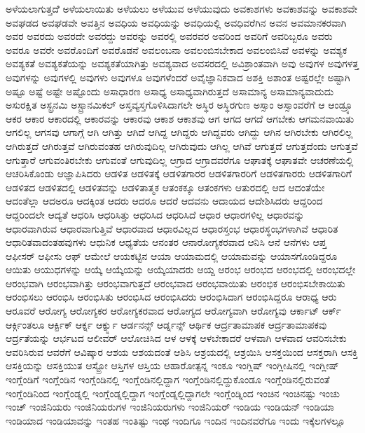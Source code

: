 {ಅಳೆಯಲಾಗುತ್ತದೆೆ
ಅಳೆಯಲಾಯಿತು
ಅಳೆಯಲು
ಅಳೆಯುವ
ಅಳೆಯುವುದು
ಅವಕಾಶಗಳು
ಅವಕಾಶವನ್ನು
ಅವಕಾಶವೇ
ಅವಘಡದ
ಅವಘಡವೇ
ಅವತ್ತಿನ
ಅವಧಿಯ
ಅವಧಿಯನ್ನು
ಅವಧಿಯಲ್ಲಿ
ಅವಧಿವರೆಗಿನ
ಅವನ
ಅವಮಾನಕರವಾಗಿ
ಅವರ
ಅವರದು
ಅವರದೇ
ಅವರದ್ದು
ಅವರನ್ನು
ಅವರಲ್ಲಿ
ಅವರವರ
ಅವರಿಂದ
ಅವರಿಗೆ
ಅವರಿಬ್ಬರೂ
ಅವರು
ಅವರೂ
ಅವರೇ
ಅವರೊಂದಿಗೆ
ಅವರೊಡನೆ
ಅವಲಂಬನಾ
ಅವಲಂಬಿಸಬೇಕಾದ
ಅವಲಂಬಿಸಿವೆ
ಅವಳನ್ನು
ಅವಶ್ಯಕ
ಅವಶ್ಯಕತೆ
ಅವಶ್ಯಕತೆಯನ್ನು
ಅವಶ್ಯಕತೆಯಾಗಿತ್ತು
ಅವಶ್ಯವಾದ
ಅವಸರದಲ್ಲಿ
ಅವಿಶ್ರಾಂತವಾಗಿ
ಅವು
ಅವುಗಳ
ಅವುಗಳತ್ತ
ಅವುಗಳನ್ನು
ಅವುಗಳಲ್ಲಿ
ಅವುಗಳು
ಅವುಗಳೂ
ಅವುಗಳೆಂದರೆ
ಅವೈಜ್ಞಾನಿಕವಾದ
ಅಶಕ್ತಿ
ಅಶಾಂತ
ಅಷ್ಟರಲ್ಲೇ
ಅಷ್ಟಾಗಿ
ಅಷ್ಟೂ
ಅಷ್ಟೆ
ಅಷ್ಟೇ
ಅಷ್ಟೊಂದು
ಅಸಾಧಾರಣ
ಅಸಾಧ್ಯ
ಅಸಾಧ್ಯವಾಗಿರುತ್ತದೆ
ಅಸಾಮಾನ್ಯ
ಅಸಾಮಾನ್ಯವಾದುದು
ಅಸುರಕ್ಷಿತ
ಅಸ್ಟ್ರನಮಿ
ಅಸ್ಟ್ರಾನಮಿಕಲ್
ಅಸ್ತವ್ಯಸ್ತಗೊಳಿಸಿದಾಗಲೇ
ಅಸ್ಥಿರ
ಅಸ್ಥಿರಗುಣ
ಅಸ್ಸಾಂ
ಅಸ್ಸಾಂವರೆಗೆ
ಆ
ಆಂಡ್ರ್ಯೂ
ಆಕರ
ಆಕಾರ
ಆಕಾರದಲ್ಲಿ
ಆಕಾರವನ್ನು
ಆಕಾರವು
ಆಕಾಶ
ಆಕಾಶವು
ಆಗ
ಆಗದ
ಆಗದೆ
ಆಗಬೇಕು
ಆಗಮನವಾಯಿತು
ಆಗಲಿಲ್ಲ
ಆಗಸವು
ಆಗಾಗ್ಗೆ
ಆಗಿ
ಆಗಿತ್ತು
ಆಗಿದೆ
ಆಗಿದ್ದ
ಆಗಿದ್ದರು
ಆಗಿದ್ದವರು
ಆಗಿದ್ದು
ಆಗಿನ
ಆಗಿರಬೇಕು
ಆಗಿರಲಿಲ್ಲ
ಆಗಿರುತ್ತದೆ
ಆಗಿರುತ್ತವೆ
ಆಗಿರುವಂತಹ
ಆಗಿರುವುದಿಲ್ಲ
ಆಗಿರುವುದು
ಆಗಿಲ್ಲ
ಆಗಿವೆ
ಆಗುತ್ತದೆ
ಆಗುತ್ತದೆಂದು
ಆಗುತ್ತವೆ
ಆಗುತ್ತಾರೆ
ಆಗುವಂತಿರಬೇಕು
ಆಗುವಂತೆ
ಆಗುವುದಿಲ್ಲ
ಆಗ್ರಾದ
ಆಗ್ರಾದವರೆಗೂ
ಆಘಾತಕ್ಕೆ
ಆಘಾತವೇ
ಆಚರಣೆಯಲ್ಲಿ
ಆಚರಿಸಿಕೊಂಡು
ಆಜ್ಞಾಪಿಸಿದರು
ಆಡಳಿತ
ಆಡಳಿತಕ್ಕೆ
ಆಡಳಿತಗಾರರ
ಆಡಳಿತಗಾರರಿಗೆ
ಆಡಳಿತಗಾರರು
ಆಡಳಿತಗಾರಿಗೆ
ಆಡಳಿತದ
ಆಡಳಿತದಲ್ಲಿ
ಆಡಳಿತವನ್ನು
ಆಡಳಿತಾತ್ಮಕ
ಆತಂಕಕ್ಕೂ
ಆತಂಕಗಳು
ಆತುರದಲ್ಲಿ
ಆದ
ಆದಂತೆಯೇ
ಆದಂತೆಲ್ಲಾ
ಆದಅರೂ
ಆದಕ್ಕಿಂತ
ಆದರು
ಆದರೂ
ಆದರೆ
ಆದವನು
ಆದಾಯದ
ಆದೇಶಿಸಿದರು
ಆದ್ದರಿಂದ
ಆದ್ದರಿಂದಲೇ
ಆದ್ಯತೆ
ಆಧರಿಸಿ
ಆಧರಿಸಿತ್ತು
ಆಧರಿಸಿದ
ಆಧರಿಸಿದೆ
ಆಧಾರ
ಆಧಾರಗಳಿಲ್ಲ
ಆಧಾರವನ್ನು
ಆಧಾರವಾಗಿರುವ
ಆಧಾರವಾಗುತ್ತಿವೆ
ಆಧಾರವಾದ
ಆಧಾರವಿಲ್ಲದ
ಆಧಾರಸ್ತಂಭ
ಆಧಾರಸ್ಥಂಭಗಳಾಗಿವೆ
ಆಧಾರಿತ
ಆಧಾರಿತವಾದಂತಹವುಗಳು
ಆಧುನಿಕ
ಆಧ್ಯತೆಯ
ಆನಂತರ
ಆನಾರೋಗ್ಯಕರವಾದ
ಆನಿಸಿ
ಆನೆ
ಆನೆಗಳು
ಆಪ್ತ
ಆಫೀಸರ್
ಆಫೀಸು
ಆಫ್
ಆಮೇಲೆ
ಆಯಕಟ್ಟಿನ
ಆಯಾ
ಆಯಾಮದಲ್ಲಿ
ಆಯಾಮವನ್ನು
ಆಯಾಸಗೊಂಡಿದ್ದರೂ
ಆಯಿತು
ಆಯುಧಗಳನ್ನು
ಆಯ್ಕೆ
ಆಯ್ಕೆಯನ್ನು
ಆಯ್ಕೆಯಾದರು
ಆಯ್ದ
ಆರಂಭ
ಆರಂಭದ
ಆರಂಭದಲ್ಲಿ
ಆರಂಭದಲ್ಲೇ
ಆರಂಭವಾಗಿ
ಆರಂಭವಾಗಿತ್ತು
ಆರಂಭವಾಗುತ್ತದೆ
ಆರಂಭವಾದ
ಆರಂಭವಾಯಿತು
ಆರಂಭಿಕ
ಆರಂಭಿಸಬೇಕಾಯಿತು
ಆರಂಭಿಸಲು
ಆರಂಭಿಸಿ
ಆರಂಭಿಸಿತು
ಆರಂಭಿಸಿದ
ಆರಂಭಿಸಿದರು
ಆರಂಭಿಸಿದಾಗ
ಆರಂಭಿಸಿದ್ದರೂ
ಆರಾಧ್ಯ
ಆರು
ಆರೂವರೆ
ಆರೋಗ್ಯ
ಆರೋಗ್ಯಕರ
ಆರೋಗ್ಯಕರವಾದ
ಆರೋಗ್ಯದ
ಆರೋಗ್ಯವಾಗಿ
ಆರೋಗ್ಯವು
ಆರ್ಕಾಟ್
ಆರ್ಕ್
ಆರ್ಕ್ಗಿಂತಲೂ
ಆರ್ಕ್ಟಿಕ್
ಆರ್ಕ್ನ
ಆರ್ಕ್ನ್ನು
ಆರ್ಡನನ್ಸ್
ಆರ್ಡ್ನನ್ಸ್
ಆರ್ಥಿಕ
ಆರ್ದ್ರತಾಮಾಪಕ
ಆರ್ದ್ರತಾಮಾಪಕವು
ಆರ್ದ್ರತೆಯನ್ನು
ಆರ್ಭಟದ
ಆಲೀವರ್
ಆಲೋಚಿಸಿದ
ಆಳ
ಆಳಕ್ಕೆ
ಆಳಬೇಕಾದರೆ
ಆಳವಾಗಿ
ಆಳವಾದ
ಆವರಿಸಬೇಕು
ಆವರಿಸಿರುವ
ಆವರೆಗೆ
ಆವಿಷ್ಕಾರ
ಆಶಯ
ಆಶಯದಂತೆ
ಆಶಿಸಿ
ಆಶ್ರಯದಲ್ಲಿ
ಆಶ್ರಯಿಸಿ
ಆಸಕ್ತಯಿಂದ
ಆಸಕ್ತರಾಗಿ
ಆಸಕ್ತಿ
ಆಸಕ್ತಿಯನ್ನು
ಆಸಕ್ತಿಯುತ
ಆಸ್ಟ್ರೋ
ಆಸ್ತಿಗಳ
ಆಸ್ತಿಯ
ಆಹಾರೋತ್ಪನ್ನ
ಇಂಕೂ
ಇಂಗ್ಲಿಷ್
ಇಂಗ್ಲೀಷಿನಲ್ಲಿ
ಇಂಗ್ಲೀಷ್
ಇಂಗ್ಲೆಂಡಿಗೆ
ಇಂಗ್ಲೆಂಡಿನ
ಇಂಗ್ಲೆಂಡಿನಲ್ಲಿ
ಇಂಗ್ಲೆಂಡಿನಲ್ಲಿದ್ದಾಗ
ಇಂಗ್ಲೆಂಡಿನಲ್ಲಿದ್ದುಕೊಂಡೂ
ಇಂಗ್ಲೆಂಡಿನಲ್ಲಿರುವಂತೆ
ಇಂಗ್ಲೆಂಡಿನಿಂದ
ಇಂಗ್ಲೆಂಡ್ನಲ್ಲಿ
ಇಂಗ್ಲೆಂಡ್ನಲ್ಲಿದ್ದಾಗ
ಇಂಗ್ಲೆಂಡ್ನಲ್ಲಿದ್ದಾಗಲೇ
ಇಂಗ್ಲೆಂಡ್ನಿಂದ
ಇಂಚಿನ
ಇಂಚಿನಷ್ಟು
ಇಂಚು
ಇಂಚ್
ಇಂಜಿನಿಯರು
ಇಂಜಿನಿಯರುಗಳ
ಇಂಜಿನಿಯರುಗಳು
ಇಂಜಿನಿಯರ್
ಇಂಡಿಯ
ಇಂಡಿಯನ್
ಇಂಡಿಯಾ
ಇಂಡಿಯಾದ
ಇಂಡಿಯಾವನ್ನು
ಇಂತಹ
ಇಂತಿಷ್ಟು
ಇಂಥ
ಇಂದಿಗೂ
ಇಂದಿನ
ಇಂದಿನವರೆಗೂ
ಇಂದು
ಇಕ್ಕೆಲಗಳಲ್ಲೂ
}
